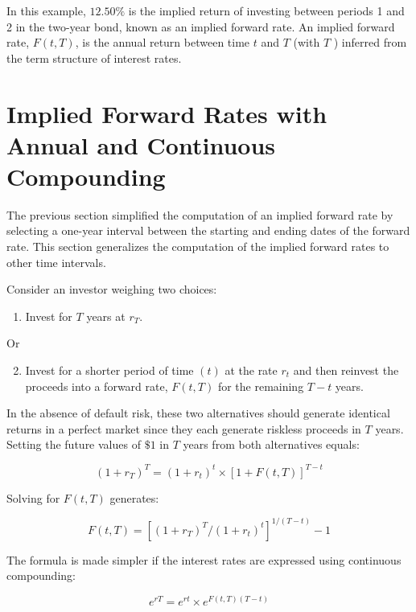\documentclass[11pt]{article}
\begin{document}
In this example, $12.50 \%$ is the implied return of investing between periods 1 and 2 in the two-year bond, known as an implied forward rate. An implied forward rate, $F(t, T)$, is the annual return between time $t$ and $T$ (with $T$ ) inferred from the term structure of interest rates.

\section*{Implied Forward Rates with Annual and Continuous Compounding}
The previous section simplified the computation of an implied forward rate by selecting a one-year interval between the starting and ending dates of the forward rate. This section generalizes the computation of the implied forward rates to other time intervals.

Consider an investor weighing two choices:

\begin{enumerate}
  \item Invest for $T$ years at $r_{T}$.
\end{enumerate}

Or

\begin{enumerate}
  \setcounter{enumi}{1}
  \item Invest for a shorter period of time $(t)$ at the rate $r_{t}$ and then reinvest the proceeds into a forward rate, $F(t, T)$ for the remaining $T-t$ years.
\end{enumerate}

In the absence of default risk, these two alternatives should generate identical returns in a perfect market since they each generate riskless proceeds in $T$ years. Setting the future values of $\$ 1$ in $T$ years from both alternatives equals:


\begin{equation*}
\left(1+r_{T}\right)^{T}=\left(1+r_{t}\right)^{t} \times[1+F(t, T)]^{T-t} \tag{1}
\end{equation*}


Solving for $F(t, T)$ generates:


\begin{equation*}
F(t, T)=\left[\left(1+r_{T}\right)^{T} /\left(1+r_{t}\right)^{t}\right]^{1 /(T-t)}-1 \tag{2}
\end{equation*}


The formula is made simpler if the interest rates are expressed using continuous compounding:


\begin{equation*}
e^{r T}=e^{r t} \times e^{F(t, T)(T-t)} \tag{3}
\end{equation*}
\end{document}
